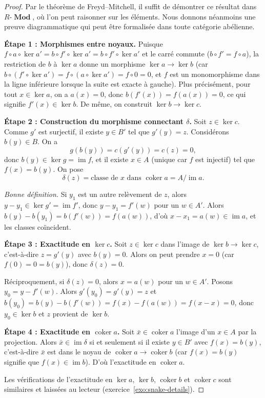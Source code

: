 \documentclass[a4paper,12pt]{book}
\DeclareMathOperator{\im}{im}
\DeclareMathOperator{\coker}{coker}
\DeclareMathOperator{\Mod}{\mathbf{Mod}}
\begin{document}
\begin{proof}
Par le théorème de Freyd--Mitchell,
il suffit de démontrer ce résultat dans $R\text{-}\Mod$, où l'on peut
raisonner sur les éléments. Nous donnons néanmoins une preuve
diagrammatique qui peut être formalisée dans toute catégorie abélienne.

\medskip
\textbf{Étape 1 : Morphismes entre noyaux.}
Puisque $f \circ a \circ \ker a' = b \circ f' \circ \ker a' = b \circ f' \circ \ker a'$
et le carré commute ($b \circ f' = f \circ a$), la restriction de $b$ à
$\ker a$ donne un morphisme $\ker a \to \ker b$ (car
$b \circ (f' \circ \ker a') = f \circ (a \circ \ker a') = f \circ 0 = 0$,
et $f$ est un monomorphisme dans la ligne inférieure lorsque la suite est
exacte à gauche). Plus précisément, pour tout $x \in \ker a$, on a
$a(x) = 0$, donc $b(f'(x)) = f(a(x)) = 0$, ce qui signifie $f'(x) \in \ker b$.
De même, on construit $\ker b \to \ker c$.

\medskip
\textbf{Étape 2 : Construction du morphisme connectant $\delta$.}
Soit $z \in \ker c$. Comme $g'$ est surjectif, il existe $y \in B'$ tel que
$g'(y) = z$. Considérons $b(y) \in B$. On a
\[
  g(b(y)) = c(g'(y)) = c(z) = 0,
\]
donc $b(y) \in \ker g = \im f$, et il existe $x \in A$ (unique car $f$ est
injectif) tel que $f(x) = b(y)$. On pose
\[
  \delta(z) = \text{classe de } x \text{ dans } \coker a = A / \im a.
\]

\emph{Bonne définition.}
Si $y_1$ est un autre relèvement de $z$, alors $y - y_1 \in \ker g' = \im f'$,
donc $y - y_1 = f'(w)$ pour un $w \in A'$. Alors
$b(y) - b(y_1) = b(f'(w)) = f(a(w))$, d'où $x - x_1 = a(w) \in \im a$,
et les classes coïncident.

\medskip
\textbf{Étape 3 : Exactitude en $\ker c$.}
Soit $z \in \ker c$ dans l'image de $\ker b \to \ker c$, c'est-à-dire
$z = g'(y)$ avec $b(y) = 0$. Alors on peut prendre $x = 0$
(car $f(0) = 0 = b(y)$), donc $\delta(z) = 0$.

Réciproquement, si $\delta(z) = 0$, alors $x = a(w)$ pour un $w \in A'$.
Posons $y_0 = y - f'(w)$. Alors $g'(y_0) = g'(y) = z$ et
$b(y_0) = b(y) - b(f'(w)) = f(x) - f(a(w)) = f(x - x) = 0$,
donc $y_0 \in \ker b$ et $z$ provient de $\ker b$.

\medskip
\textbf{Étape 4 : Exactitude en $\coker a$.}
Soit $\bar{x} \in \coker a$ l'image d'un $x \in A$ par la projection.
Alors $\bar{x} \in \im \delta$ si et seulement si il existe $y \in B'$
avec $f(x) = b(y)$, c'est-à-dire $\bar{x}$ est dans le noyau de
$\coker a \to \coker b$ (car $f(x) = b(y)$ signifie que $f(x) \in \im b$).
D'où l'exactitude en $\coker a$.

Les vérifications de l'exactitude en $\ker a$, $\ker b$, $\coker b$ et
$\coker c$ sont similaires et laissées au lecteur (exercice~\ref{exo:snake-details}).
\end{proof}
\end{document}
